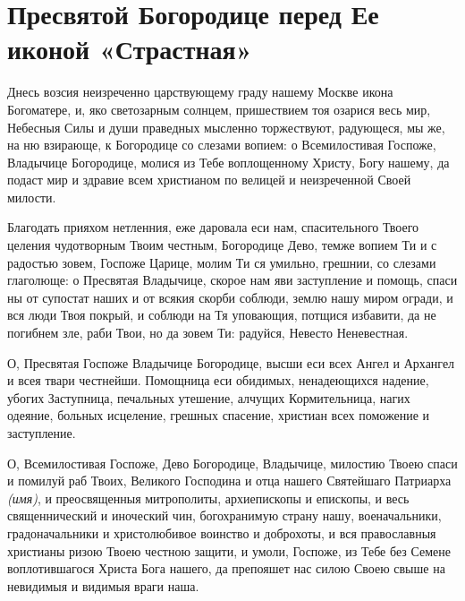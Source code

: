 
\section{Пресвятой Богородице перед Ее иконой «Страстная»}\begin{mymulticols}



Днесь возсия неизреченно царствующему граду нашему Москве икона Богоматере, и, яко светозарным солнцем, пришествием тоя озарися весь мир, Небесныя Силы и души праведных мысленно торжествуют, радующеся, мы же, на ню взирающе, к Богородице со слезами вопием: о Всемилостивая Госпоже, Владычице Богородице, молися из Тебе воплощенному Христу, Богу нашему, да подаст мир и здравие всем христианом по велицей и неизреченной Своей милости.


Благодать прияхом нетленния, еже даровала еси нам, спасительного Твоего целения чудотворным Твоим честным, Богородице Дево, темже вопием Ти и с радостью зовем, Госпоже Царице, молим Ти ся умильно, грешнии, со слезами глаголюще: о Пресвятая Владычице, скорое нам яви заступление и помощь, спаси ны от супостат наших и от всякия скорби соблюди, землю нашу миром огради, и вся люди Твоя покрый, и соблюди на Тя уповающия, потщися избавити, да не погибнем зле, раби Твои, но да зовем Ти: радуйся, Невесто Неневестная.


О, Пресвятая Госпоже Владычице Богородице, высши еси всех Ангел и Архангел и всея твари честнейши. Помощница еси обидимых, ненадеющихся надение, убогих Заступница, печальных утешение, алчущих Кормительница, нагих одеяние, больных исцеление, грешных спасение, христиан всех поможение и заступление. 

О, Всемилостивая Госпоже, Дево Богородице, Владычице, милостию Твоею спаси и помилуй раб Твоих, Великого Господина и отца нашего Святейшаго Патриарха {\itshape(имя)}, и преосвященныя митрополиты, архиепископы и епископы, и весь священнический и иноческий чин, богохранимую страну нашу, военачальники, градоначальники и христолюбивое воинство и доброхоты, и вся православныя христианы ризою Твоею честною защити, и умоли, Госпоже, из Тебе без Семене воплотившагося Христа Бога нашего, да препояшет нас силою Своею свыше на невидимыя и видимыя враги наша. 


\end{mymulticols}
